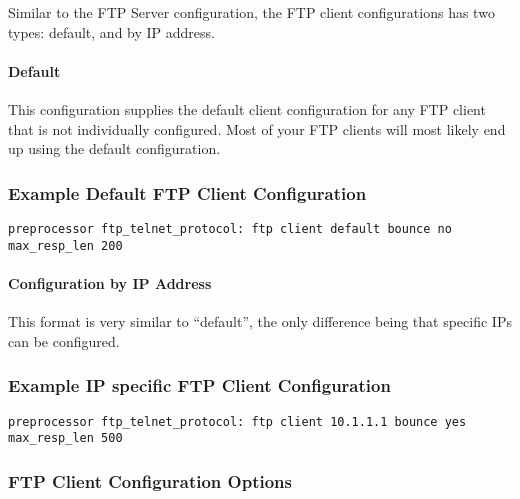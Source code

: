 \documentclass[english]{report}
\begin{document}
Similar to the FTP Server configuration, the FTP client configurations
has two types: default, and by IP address.

\paragraph{Default}

This configuration supplies the default client configuration for any FTP
client that is not individually configured.  Most of your FTP clients will
most likely end up using the default configuration.

\subsubsection{Example Default FTP Client Configuration}
\begin{verbatim}
preprocessor ftp_telnet_protocol: ftp client default bounce no max_resp_len 200
\end{verbatim}

\paragraph{Configuration by IP Address}

This format is very similar to ``default'', the only difference being that
specific IPs can be configured.

\subsubsection{Example IP specific FTP Client Configuration}
\begin{verbatim}
preprocessor ftp_telnet_protocol: ftp client 10.1.1.1 bounce yes max_resp_len 500
\end{verbatim}

\subsubsection{FTP Client Configuration Options}
\end{document}
